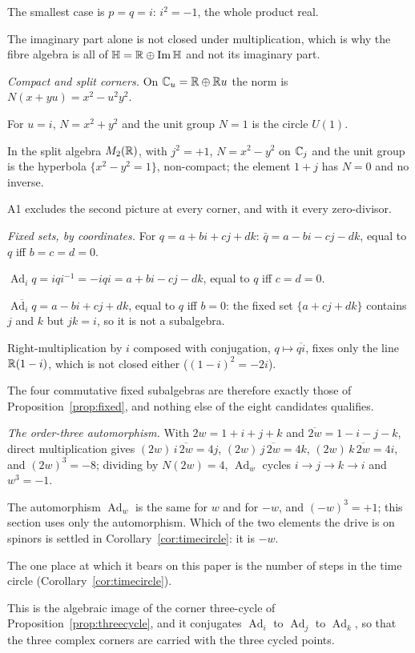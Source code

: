 \documentclass[11pt,a4paper]{article}
\theoremstyle{plain}
\theoremstyle{definition}
\theoremstyle{remark}
\newcommand{\Hquat}{\mathbb{H}}
\newcommand{\ImH}{\operatorname{Im}\Hquat}
\newcommand{\Ad}{\operatorname{Ad}}
\begin{document}
The smallest case is $p=q=i$: $i^{2}=-1$, the whole product real.

The imaginary part alone is not closed under multiplication, which is why the fibre algebra is all of $\Hquat=\R\oplus\ImH$ and not its imaginary part.

\emph{Compact and split corners.} On $\mathbb{C}_{u}=\mathbb{R}\oplus\mathbb{R} u$ the norm is $N(x+yu)=x^{2}-u^{2}y^{2}$.

For $u=i$, $N=x^{2}+y^{2}$ and the unit group $N=1$ is the circle $U(1)$.

In the split algebra $M_{2}(\mathbb{R})$, with $j^{2}=+1$, $N=x^{2}-y^{2}$ on $\mathbb{C}_{j}$ and the unit group is the hyperbola $\{x^{2}-y^{2}=1\}$, non-compact; the element $1+j$ has $N=0$ and no inverse.

A1 excludes the second picture at every corner, and with it every zero-divisor.

\emph{Fixed sets, by coordinates.} For $q=a+bi+cj+dk$: $\bar q=a-bi-cj-dk$, equal to $q$ iff $b=c=d=0$.

$\Ad_{i}q=iqi^{-1}=-iqi=a+bi-cj-dk$, equal to $q$ iff $c=d=0$.

$\overline{\Ad_{i}q}=a-bi+cj+dk$, equal to $q$ iff $b=0$: the fixed set $\{a+cj+dk\}$ contains $j$ and $k$ but $jk=i$, so it is not a subalgebra.

Right-multiplication by $i$ composed with conjugation, $q\mapsto\overline{qi}$, fixes only the line $\mathbb{R}(1-i)$, which is not closed either ($(1-i)^{2}=-2i$).

The four commutative fixed subalgebras are therefore exactly those of Proposition~\ref{prop:fixed}, and nothing else of the eight candidates qualifies.

\emph{The order-three automorphism.} With $2w=1+i+j+k$ and $\overline{2w}=1-i-j-k$, direct multiplication gives $(2w)\,i\,\overline{2w}=4j$, $(2w)\,j\,\overline{2w}=4k$, $(2w)\,k\,\overline{2w}=4i$, and $(2w)^{3}=-8$; dividing by $N(2w)=4$, $\Ad_{w}$ cycles $i\to j\to k\to i$ and $w^{3}=-1$.

The automorphism $\Ad_{w}$ is the same for $w$ and for $-w$, and $(-w)^{3}=+1$; this section uses only the automorphism. Which of the two elements the drive is on spinors is settled in Corollary~\ref{cor:timecircle}: it is $-w$.

The one place at which it bears on this paper is the number of steps in the time circle (Corollary~\ref{cor:timecircle}).

This is the algebraic image of the corner three-cycle of Proposition~\ref{prop:threecycle}, and it conjugates $\Ad_{i}$ to $\Ad_{j}$ to $\Ad_{k}$, so that the three complex corners are carried with the three cycled points.
\end{document}
